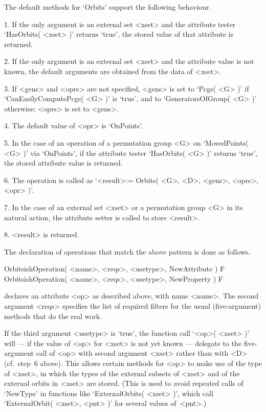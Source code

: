 The default methods for `Orbits' support the following behaviour.
\beginlist%
  \item{1.}
    If the only argument is an external set <xset> and the attribute
    tester `HasOrbits( <xset> )' returns `true',
    the stored value of that attribute is returned.
  \item{2.}
    If the only argument is an external set <xset> and the attribute
    value is not known,
    the default arguments are obtained from the data of <xset>.
  \item{3.}
    If <gens> and <oprs> are not specified,
    <gens> is set to `Pcgs( <G> )' if `CanEasilyComputePcgs( <G> )'
    is `true', and to `GeneratorsOfGroup( <G> )' otherwise;
    <oprs> is set to <gens>.
  \item{4.}
    The default value of <opr> is `OnPoints'.
  \item{5.}
    In the case of an operation of a permutation group <G>
    on `MovedPoints( <G> )' via `OnPoints',
    if the attribute tester `HasOrbits( <G> )' returns `true',
    the stored attribute value is returned.
  \item{6.}
    The operation is called as `<result>:= Orbits( <G>, <D>, <gens>,
    <oprs>, <opr> )'.
  \item{7.}
    In the case of an external set <xset> or a permutation group <G> in its
    natural action, the attribute setter is called to store <result>.
  \item{8.}
    <result> is returned.
\endlist

The declaration of operations that match the above pattern is done
as follows.

\>OrbitsishOperation( <name>, <reqs>, <usetype>, NewAttribute ) F
\>OrbitsishOperation( <name>, <reqs>, <usetype>, NewProperty ) F

declares an attribute <op> as described above, with name <name>.
The second argument <reqs> specifies the list of required filters
for the usual (five-argument) methods that do the real work.

If the third argument <usetype> is `true',
the function call `<op>( <xset> )' will
--- if the value of <op> for <xset> is not yet known ---
delegate to the five-argument call of <op> with second argument <xset>
rather than with <D> (cf.~step~6 above).
This allows certain methods for <op> to make use of the type of <xset>,
in which the types of the external subsets of <xset>
and of the external orbits in <xset> are stored.
(This is used to avoid repeated calls of `NewType' in functions like
`ExternalOrbits( <xset> )',
which call `ExternalOrbit( <xset>, <pnt> )' for several values of~<pnt>.)

